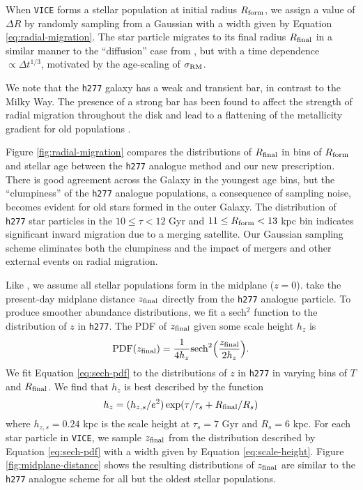\documentclass[twocolumn,twocolappendix,linenumbers]{aastex631}
\newcommand{\vice}{{\tt VICE}\xspace}
\newcommand{\hydro}{{\tt h277}\xspace}
\begin{document}
When \vice forms a stellar population at initial radius $R_{\rm form}$, we assign a value of $\Delta R$ by randomly sampling from a Gaussian with a width given by Equation \ref{eq:radial-migration}. The star particle migrates to its final radius $R_{\rm final}$ in a similar manner to the ``diffusion'' case from , but with a time dependence $\propto \Delta t^{1/3}$, motivated by the age-scaling of $\sigma_{\rm RM}$.

We note that the \hydro galaxy has a weak and transient bar, in contrast to the Milky Way. The presence of a strong bar has been found to affect the strength of radial migration throughout the disk \citep[e.g.,][]{Brunetti2011-BarredSpiralDiffusion} and lead to a flattening of the metallicity gradient for old populations \citep{Okalidis2022-AurigaMigration}.

Figure \ref{fig:radial-migration} compares the distributions of $R_{\rm final}$ in bins of $R_{\rm form}$ and stellar age between the \hydro analogue method and our new prescription. There is good agreement across the Galaxy in the youngest age bins, but the ``clumpiness'' of the \hydro analogue populations, a consequence of sampling noise, becomes evident for old stars formed in the outer Galaxy. The distribution of \hydro star particles in the $10\leq\tau<12$ Gyr and $11\leq R_{\rm form}<13$ kpc bin indicates significant inward migration due to a merging satellite. Our Gaussian sampling scheme eliminates both the clumpiness and the impact of mergers and other external events on radial migration.

Like , we assume all stellar populations form in the midplane ($z=0$).  take the present-day midplane distance $z_{\rm final}$ directly from the \hydro analogue particle. To produce smoother abundance distributions, we fit a sech$^2$ function \citep{Spitzer1942} to the distribution of $z$ in \hydro. The PDF of $z_{\rm final}$ given some scale height $h_z$ is
\begin{equation}
    {\rm PDF}(z_{\rm final}) = \frac{1}{4 h_z} {\rm sech}^2\Big(\frac{z_{\rm final}}{2 h_z}\Big).
    \label{eq:sech-pdf}
\end{equation}
We fit Equation \ref{eq:sech-pdf} to the distributions of $z$ in \hydro in varying bins of $T$ and $R_{\rm final}$. We find that $h_z$ is best described by the function
\begin{equation}
    h_z = (h_{z,s}/e^2) \exp(\tau/\tau_s + R_{\rm final}/R_s)
    \label{eq:scale-height}
\end{equation}
where $h_{z,s}=0.24$ kpc is the scale height at $\tau_s=7$ Gyr and $R_s=6$ kpc.
For each star particle in \vice, we sample $z_{\rm final}$ from the distribution described by Equation \ref{eq:sech-pdf} with a width given by Equation \ref{eq:scale-height}. Figure \ref{fig:midplane-distance} shows the resulting distributions of $z_{\rm final}$ are similar to the \hydro analogue scheme for all but the oldest stellar populations.


\end{document}
